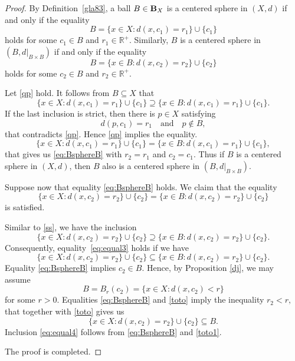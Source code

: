 \documentclass{article}
\begin{document}
\begin{proof}
By Definition~\ref{gla83}, a ball $B \in {\bf B}_X$ is a centered sphere in $(X,d)$
if and only if the equality
\begin{equation}
    \label{qp}
B = \{ x \in X \colon d(x,c_1)=r_1 \}\cup\{c_1\}
\end{equation}
holds for some $c_1 \in B$ and $r_1 \in \mathbb{R}^+.$
Similarly, $B$ is a centered sphere in $(B,d|_{B\times B})$
if and only if the equality
\begin{equation}\label{eq:BsphereB}
B=\{x\in B:d(x,c_2)=r_2\}\cup\{c_2\}
\end{equation}
holds
for some $c_2\in B$ and $r_2\in\mathbb{R}^+$.




Let \eqref{qp} hold. It follows from $B\subseteq X$ that
\begin{equation}\label{ss}
\{x\in X : d(x,c_1)=r_1\}\cup \{c_1\} \supseteq \{x\in B : d(x,c_1)=r_1\}\cup \{c_1\}.
\end{equation}
If the last inclusion is strict, then there is $p\in X$ satisfying
\[
d(p,c_1)=r_1 \quad \text{and} \quad p\notin B,
\]
that contradicts \eqref{qp}. Hence \eqref{qp} implies the equality.
\begin{equation*}
\{x\in X:d(x,c_1)=r_1\}\cup\{c_1\}
=
\{x\in B:d(x,c_1)=r_1\}\cup\{c_1\},
\end{equation*}
that gives us \eqref{eq:BsphereB}
with $r_2=r_1$ and $c_2=c_1$.
Thus if $B$ is a centered sphere in $(X,d)$, then $B$ also is  a
centered sphere in $(B,d|_{B\times B})$.

Suppose now that equality \eqref{eq:BsphereB} holds.
We claim that the equality
\begin{equation}\label{eq:equal3}
\{x\in X:d(x,c_2)=r_2\}\cup\{c_2\}
=
\{x\in B:d(x,c_2)=r_2\}\cup\{c_2\}
\end{equation}
is satisfied.

Similar to \eqref{ss}, we have  the inclusion
\begin{equation*}
\{x\in X:d(x,c_2)=r_2\}\cup\{c_2\}
\supseteq
\{x\in B:d(x,c_2)=r_2\}\cup\{c_2\}.
\end{equation*}
Consequently, equality~\eqref{eq:equal3} holds if we have
\begin{equation}\label{eq:equal4}
\{x\in X:d(x,c_2)=r_2\}\cup\{c_2\}
\subseteq
\{x\in B:d(x,c_2)=r_2\}\cup\{c_2\}.
\end{equation}
Equality \eqref{eq:BsphereB} implies $c_2\in B$. Hence, by Proposition \ref{dj}, we may assume  
\begin{equation}
    \label{toto}
B = B_r(c_2)=\{x\in X \colon d(x,c_2)<r\}
\end{equation}
 for some \( r > 0 \).
Equalities \eqref{eq:BsphereB} and \eqref{toto} imply the inequality
\(
    r_2<r,
\)
that together with \eqref{toto} gives us
\begin{equation}
    \label{toto1}
\{x\in X \colon d(x,c_2)=r_2\}\cup\{c_2\}\subseteq B.
\end{equation}
Inclusion \eqref{eq:equal4} follows from \eqref{eq:BsphereB} and \eqref{toto1}.

The proof is completed.
\end{proof}
\end{document}

